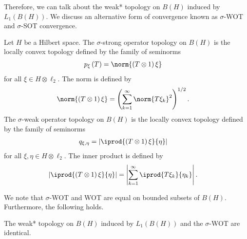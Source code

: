 \documentclass[10pt]{mypackage}
\begin{document}
Therefore, we can talk about the weak* topology on $B(H)$ induced by $L_1\left( B(H) \right)$. We discuss an alternative form of convergence known as $\sigma$-WOT and $\sigma$-SOT convergence.
\begin{definition}
  Let $H$ be a Hilbert space. The $\sigma$-strong operator topology on $B(H)$ is the locally convex topology defined by the family of seminorms
  \begin{align*}
    p_{\xi}\left( T \right) &= \norm{\left( T\otimes 1 \right)\xi}
  \end{align*}
  for all $\xi\in H\otimes \ell_2$. The norm is defined by
  \begin{align*}
    \norm{\left( T\otimes 1 \right)\xi} &= \left( \sum_{k=1}^{\infty}\norm{T\xi_k}^{2} \right)^{1/2}.
  \end{align*}
  The $\sigma$-weak operator topology on $B(H)$ is the locally convex topology defined by the family of seminorms
  \begin{align*}
    q_{\xi,\eta} &= \left\vert \iprod{\left( T\otimes 1 \right)\xi}{\eta} \right\vert
  \end{align*}
  for all $\xi,\eta\in H\otimes \ell_2$. The inner product is defined by
  \begin{align*}
    \left\vert \iprod{\left( T\otimes 1 \right)\xi}{\eta} \right\vert &= \left\vert \sum_{k=1}^{\infty} \iprod{T\xi_k}{\eta_k}\right\vert.
  \end{align*}
\end{definition}
We note that $\sigma$-WOT and WOT are equal on bounded subsets of $B(H)$. Furthermore, the following holds.
\begin{proposition}
  The weak* topology on $B(H)$ induced by $L_1\left( B(H) \right)$ and the $\sigma$-WOT are identical.
\end{proposition}
\end{document}
